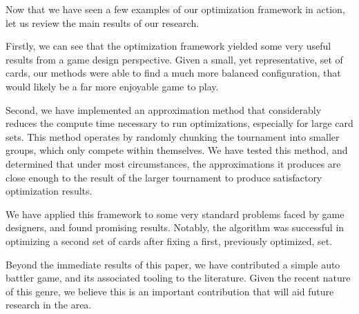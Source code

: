 Now that we have seen a few examples of our optimization framework in action, let us review the main results of our research. 

Firstly, we can see that the optimization framework yielded some very useful results from a game design perspective. Given a small, yet representative, set of cards, our methods were able to find a much more balanced configuration, that would likely be a far more enjoyable game to play.

Second, we have implemented an approximation method that considerably reduces the compute time necessary to run optimizations, especially for large card sets. This method operates by randomly chunking the tournament into smaller groups, which only compete within themselves. We have tested this method, and determined that under most circumstances, the approximations it produces are close enough to the result of the larger tournament to produce satisfactory optimization results.

We have applied this framework to some very standard problems faced by game designers, and found promising results. Notably, the algorithm was successful in optimizing a second set of cards after fixing a first, previously optimized, set.

Beyond the immediate results of this paper, we have contributed a simple auto battler game, and its associated tooling to the literature. Given the recent nature of this genre, we believe this is an important contribution that will aid future research in the area. 